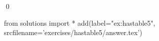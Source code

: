 
\begin{ex} 
  \label{ex:hastable5}
  
  \qed
\end{ex} 
\begin{python0}
from solutions import *
add(label="ex:hastable5",
    srcfilename='exercises/hastable5/answer.tex') 
\end{python0}
